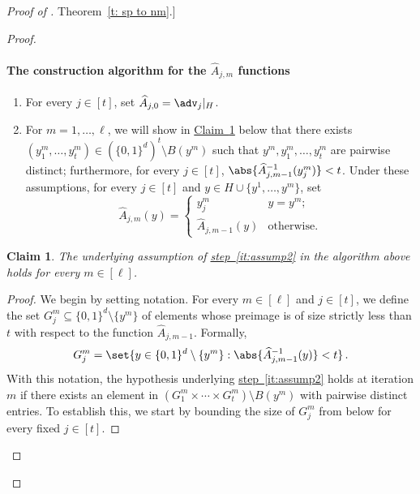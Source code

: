 \documentclass[11pt]{article}
\numberwithin{equation}{section}
\newtheorem{claim}[theorem]{Claim}
\theoremstyle{definition}
\theoremstyle{plain}
\newcommand{\expref}[2]{\hyperref[#2]{#1~\ref{#2}}}
\newcommand{\expeqref}[2]{\hyperref[#2]{#1~\eqref{#2}}}
\begin{document}
\begin{proof}[Proof of \expref{Theorem}{t: sp to nm}.]
\begin{proof}
\paragraph{The construction algorithm for the $\widehat{A}_{j,m}$ functions}
\begin{enumerate}
  	\item\label{it:assump1} For every $j \in [t]$, set $\widehat{A}_{j,0} = \adv_{j}|_{H}$. 
%
  	\item\label{it:assump2} For $m = 1,\ldots, \ell$, we will show in \expref{Claim}{c:step 2} below that there exists $(y^m_{1},\ldots,y^m_{t})\in (\{0,1\}^d)^t \setminus B(y^m)$ such that $y^m, y^m_{1},\ldots,y^m_{t}$ are pairwise distinct; furthermore, for every $j \in [t]$, $\abs{\widehat{A}_{j,m-1}^{-1}(y^m_{j})} < t$. Under these assumptions, for every $j \in [t]$ and $y \in H \cup \{y^1,\ldots, y^m\}$, set 
  	\[\widehat{A}_{j,m}(y) = \begin{cases}
  	y^m_{j} &  y = y^m; \\
  	\widehat{A}_{j,m-1}(y) & \text{otherwise}.
  	\end{cases}\]



\end{enumerate}

\begin{claim}\label{c:step 2}
	The underlying assumption of \expeqref{step}{it:assump2} in the algorithm above holds for every $m \in [\ell]$.
\end{claim}

\begin{proof}
We begin by setting  notation.
For every $m \in [\ell]$ and $j \in [t]$, we define the set $G_j^m \subseteq \{0,1\}^d \setminus \{ y^m\}$ of elements whose preimage is of size strictly less than $t$ with respect to the function $\widehat{A}_{j,m-1}$. Formally,
\[G_j^m = \set{y \in \{0,1\}^d \setminus \{ y^m\} : \abs{{\widehat{A}_{j,m-1}}^{-1}(y)} < t}\,.\]
With this notation, the hypothesis underlying \expeqref{step}{it:assump2} holds at iteration $m$ if there exists an element in $(G_1^m \times \cdots \times G_t^m) \setminus B(y^m)$ with pairwise distinct entries. To establish this, we start by bounding the size of $G_j^m$ from below for every fixed $j \in [t]$.


\end{proof}
\end{proof}
\end{proof}
\end{document}
